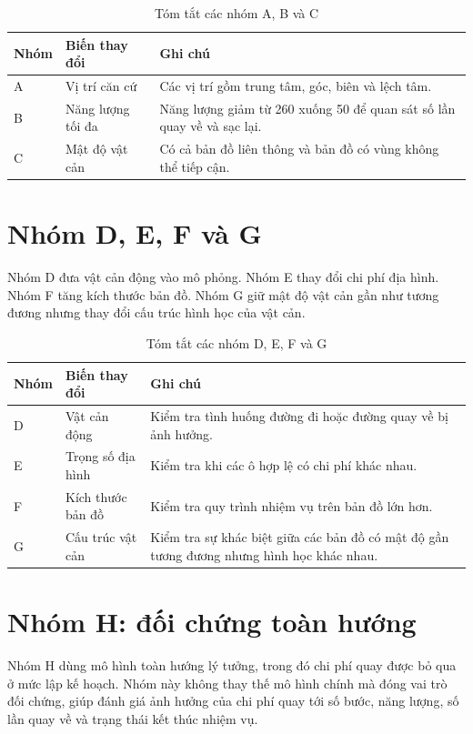 \documentclass[../DoAn.tex]{subfiles}
\begin{document}
\begin{table}[H]
\centering
\caption{Tóm tắt các nhóm A, B và C}
\small
\setlength{\tabcolsep}{4pt}
\renewcommand{\arraystretch}{1.08}
\begin{tabular}{|C{0.10\textwidth}|L{0.25\textwidth}|L{0.55\textwidth}|}
\hline
\textbf{Nhóm} & \textbf{Biến thay đổi} & \textbf{Ghi chú} \\
\hline
A & Vị trí căn cứ & Các vị trí gồm trung tâm, góc, biên và lệch tâm. \\
\hline
B & Năng lượng tối đa & Năng lượng giảm từ 260 xuống 50 để quan sát số lần quay về và sạc lại. \\
\hline
C & Mật độ vật cản & Có cả bản đồ liên thông và bản đồ có vùng không thể tiếp cận. \\
\hline
\end{tabular}
\end{table}

\section{Nhóm D, E, F và G}

Nhóm D đưa vật cản động vào mô phỏng. Nhóm E thay đổi chi phí địa hình. Nhóm F tăng kích thước bản đồ. Nhóm G giữ mật độ vật cản gần như tương đương nhưng thay đổi cấu trúc hình học của vật cản.

\begin{table}[H]
\centering
\caption{Tóm tắt các nhóm D, E, F và G}
\small
\setlength{\tabcolsep}{4pt}
\renewcommand{\arraystretch}{1.08}
\begin{tabular}{|C{0.10\textwidth}|L{0.25\textwidth}|L{0.55\textwidth}|}
\hline
\textbf{Nhóm} & \textbf{Biến thay đổi} & \textbf{Ghi chú} \\
\hline
D & Vật cản động & Kiểm tra tình huống đường đi hoặc đường quay về bị ảnh hưởng. \\
\hline
E & Trọng số địa hình & Kiểm tra khi các ô hợp lệ có chi phí khác nhau. \\
\hline
F & Kích thước bản đồ & Kiểm tra quy trình nhiệm vụ trên bản đồ lớn hơn. \\
\hline
G & Cấu trúc vật cản & Kiểm tra sự khác biệt giữa các bản đồ có mật độ gần tương đương nhưng hình học khác nhau. \\
\hline
\end{tabular}
\end{table}

\section{Nhóm H: đối chứng toàn hướng}

Nhóm H dùng mô hình toàn hướng lý tưởng, trong đó chi phí quay được bỏ qua ở mức lập kế hoạch. Nhóm này không thay thế mô hình chính mà đóng vai trò đối chứng, giúp đánh giá ảnh hưởng của chi phí quay tới số bước, năng lượng, số lần quay về và trạng thái kết thúc nhiệm vụ.
\end{document}
